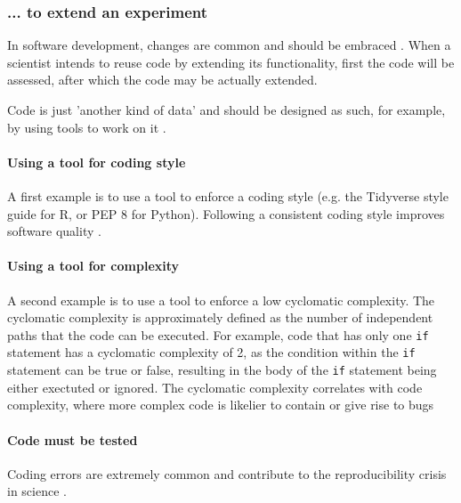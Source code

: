 \subsubsection{... to extend an experiment}

In software development, 
changes are common and should be embraced \cite{beck2000extreme}.
When a scientist intends to reuse code by extending its functionality,
first the code will be assessed,
after which the code may be actually extended.

Code is just 'another kind of data' and should be designed 
as such, for example, by using tools to work on it \cite{wilson2022twelve}.

\paragraph{Using a tool for coding style}

A first example is to use a tool to enforce a coding style 
(e.g. the Tidyverse style guide \cite{wickham2019advanced} for R,
or PEP 8 \cite{van2001pep} for Python).
Following a consistent coding style improves software quality \cite{fang2001}.

\paragraph{Using a tool for complexity}

A second example is to use a tool to enforce a low cyclomatic complexity.
The cyclomatic complexity is approximately defined 
as the number of independent paths that
the code can be executed. 
For example, code that has only one \verb|if| statement
has a cyclomatic complexity of 2, as the condition within the \verb|if|
statement can be true or false,
resulting in the body of the \verb|if| statement being either
exectuted or ignored.
The cyclomatic complexity correlates with code complexity,
where more complex code is likelier to contain or give rise to bugs 
\cite{abd2018calculating,chen2019empirical,zimmermann2008predicting}

\paragraph{Code must be tested}

Coding errors are extremely common 
and contribute to the reproducibility crisis in science \cite{vable2021code}.


